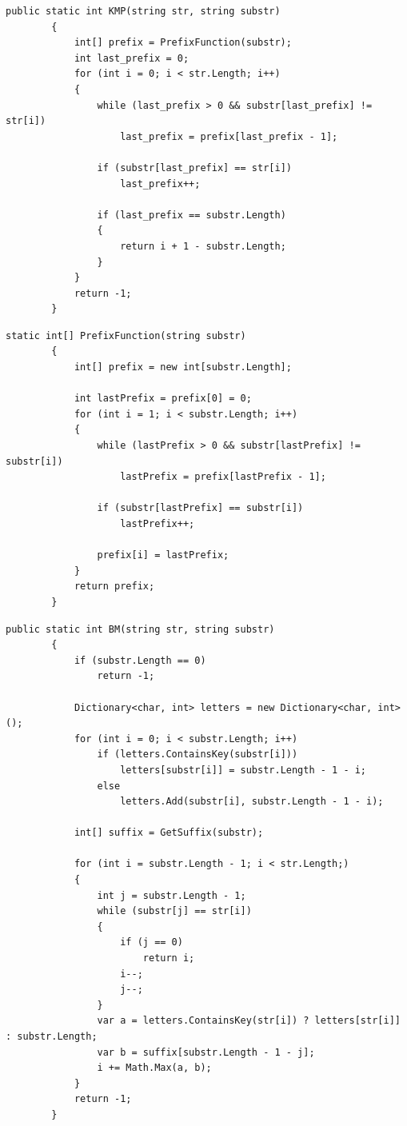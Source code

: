 \documentclass[12pt]{report}
\begin{document}
\begin{lstlisting}[label=some-code,caption=Алгоритм KMP]
public static int KMP(string str, string substr)
        {
            int[] prefix = PrefixFunction(substr);
            int last_prefix = 0;
            for (int i = 0; i < str.Length; i++)
            {
                while (last_prefix > 0 && substr[last_prefix] != str[i])
                    last_prefix = prefix[last_prefix - 1];

                if (substr[last_prefix] == str[i])
                    last_prefix++;

                if (last_prefix == substr.Length)
                {
                    return i + 1 - substr.Length;
                }
            }
            return -1;
        }
\end{lstlisting}

\begin{lstlisting}[label=some-code,caption=Функция нахождения массива сдвигов]
static int[] PrefixFunction(string substr)
        {
            int[] prefix = new int[substr.Length];

            int lastPrefix = prefix[0] = 0;
            for (int i = 1; i < substr.Length; i++)
            {
                while (lastPrefix > 0 && substr[lastPrefix] != substr[i])
                    lastPrefix = prefix[lastPrefix - 1];

                if (substr[lastPrefix] == substr[i])
                    lastPrefix++;

                prefix[i] = lastPrefix;
            }
            return prefix;
        }
\end{lstlisting}


\begin{lstlisting}[label=some-code,caption= Алгоритм Бойера-Мура]
public static int BM(string str, string substr)
        {
            if (substr.Length == 0)
                return -1;
            
            Dictionary<char, int> letters = new Dictionary<char, int>();
            for (int i = 0; i < substr.Length; i++)
                if (letters.ContainsKey(substr[i]))
                    letters[substr[i]] = substr.Length - 1 - i;
                else
                    letters.Add(substr[i], substr.Length - 1 - i);

            int[] suffix = GetSuffix(substr);

            for (int i = substr.Length - 1; i < str.Length;)
            {
                int j = substr.Length - 1;
                while (substr[j] == str[i])
                {
                    if (j == 0)
                        return i;
                    i--;
                    j--;
                }
                var a = letters.ContainsKey(str[i]) ? letters[str[i]] : substr.Length;
                var b = suffix[substr.Length - 1 - j];
                i += Math.Max(a, b);
            }
            return -1;
        }
\end{lstlisting}
\end{document}
